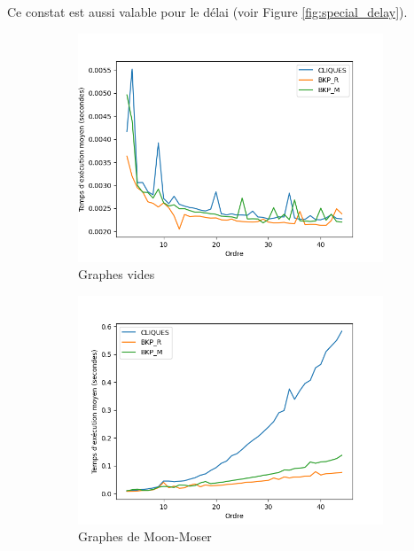 \documentclass[12pt,a4paper]{article}
\begin{document}
Ce constat est aussi valable pour le délai (voir Figure \ref{fig:special_delay}).
\begin{figure}[ht]
  \centering
  \begin{subfigure}[b]{0.42\textwidth}
    \includegraphics[width=\textwidth]{images/delay_pivot_empty_plot.png}
    \caption{Graphes vides}
    \label{subfig:delay_empty}
  \end{subfigure}
  \begin{subfigure}[b]{0.42\textwidth}
    \includegraphics[width=\textwidth]{images/delay_pivot_turan_plot.png}
    \caption{Graphes de Moon-Moser}
    \label{subfig:delay_turan}
  \end{subfigure}
  \begin{subfigure}[b]{0.42\textwidth}

\end{subfigure}
\end{figure}
\end{document}
